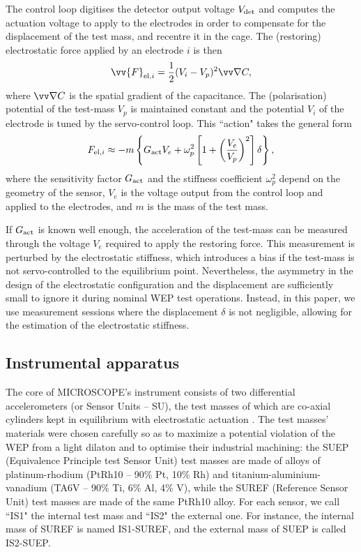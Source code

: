 \documentclass[12pt]{iopart}
\begin{document}
The control loop digitises the detector output voltage $V_{\rm det}$ and computes the actuation voltage to apply to the electrodes in order to compensate for the displacement of the test mass, and recentre it in the cage. The (restoring) electrostatic force applied by an electrode $i$ is then
\begin{equation}
\vv{F}_{{\rm el}, i} = \frac{1}{2} (V_i - V_p)^2 \vv\nabla C,
\end{equation}
where $\vv\nabla C$ is the spatial gradient of the capacitance. The (polarisation) potential of the test-mass $V_p$ is maintained constant and the potential $V_i$ of the electrode is tuned by the servo-control loop.
This ``action" takes the general form
\begin{equation} \label{eq_action}
F_{{\rm el}, i} \approx -m \left\{G_{\rm act} V_e + \omega_p^2 \left[1 + \left(\frac{V_e}{V_p}\right)^2\right] \delta \right\},
\end{equation}
where the sensitivity factor $G_{\rm act}$ and the stiffness coefficient $\omega_p^2$ depend on the geometry of the sensor, $V_e$ is the voltage output from the control loop and applied to the electrodes, and $m$ is the mass of the test mass.

If $G_{\rm act}$ is known well enough, the acceleration of the test-mass can be measured through the voltage $V_e$ required to apply the restoring force. This measurement is perturbed by the electrostatic stiffness, which introduces a bias if the test-mass is not servo-controlled to the equilibrium point. Nevertheless, the asymmetry in the design of the electrostatic configuration and the displacement are sufficiently small to ignore it during nominal WEP test operations. Instead, in this paper, we use measurement sessions where the displacement $\delta$ is not negligible, allowing for the estimation of the electrostatic stiffness.



\subsection{Instrumental apparatus}

The core of MICROSCOPE's instrument consists of two differential accelerometers (or Sensor Units -- SU), the test masses of which are co-axial cylinders kept in equilibrium with electrostatic actuation \cite{liorzou20}. The test masses' materials were chosen carefully so as to maximize a potential violation of the WEP from a light dilaton \cite{damour94, damour10a, damour10b} and to optimise their industrial machining: the SUEP (Equivalence Principle test Sensor Unit) test masses are made of alloys of platinum-rhodium (PtRh10 -- 90\% Pt, 10\% Rh) and titanium-aluminium-vanadium (TA6V -- 90\% Ti, 6\% Al, 4\% V), while the SUREF (Reference Sensor Unit) test masses are made of the same PtRh10 alloy. For each sensor, we call ``IS1" the internal test mass and ``IS2" the external one. For instance, the internal mass of SUREF is named IS1-SUREF, and the external mass of SUEP is called IS2-SUEP.
\end{document}
